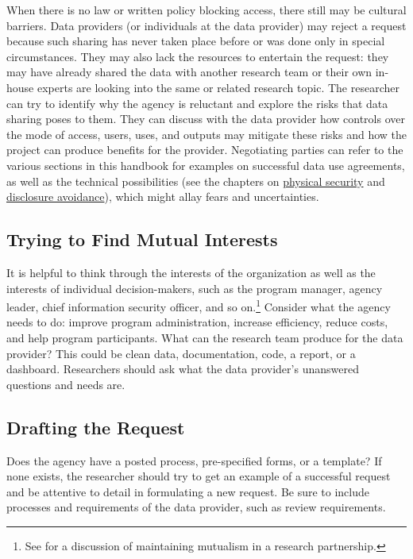 \documentclass[
]{book}
\begin{document}
When there is no law or written policy blocking access, there still may be cultural barriers. Data providers (or individuals at the data provider) may reject a request because such sharing has never taken place before or was done only in special circumstances. They may also lack the resources to entertain the request: they may have already shared the data with another research team or their own in-house experts are looking into the same or related research topic. The researcher can try to identify why the agency is reluctant and explore the risks that data sharing poses to them. They can discuss with the data provider how controls over the mode of access, users, uses, and outputs may mitigate these risks and how the project can produce benefits for the provider. Negotiating parties can refer to the various sections in this handbook for examples on successful data use agreements, as well as the technical possibilities (see the chapters on \protect\hyperlink{security}{physical security} and \protect\hyperlink{discavoid}{disclosure avoidance}), which might allay fears and uncertainties.

\hypertarget{trying-to-find-mutual-interests}{%
\subsection{Trying to Find Mutual Interests}\label{trying-to-find-mutual-interests}}

It is helpful to think through the interests of the organization as well as the interests of individual decision-makers, such as the program manager, agency leader, chief information security officer, and so on.\footnote{See \citet{coburn2013} for a discussion of maintaining mutualism in a research partnership.} Consider what the agency needs to do: improve program administration, increase efficiency, reduce costs, and help program participants. What can the research team produce for the data provider? This could be clean data, documentation, code, a report, or a dashboard. Researchers should ask what the data provider's unanswered questions and needs are.

\hypertarget{drafting-the-request}{%
\subsection{Drafting the Request}\label{drafting-the-request}}

Does the agency have a posted process, pre-specified forms, or a template? If none exists, the researcher should try to get an example of a successful request and be attentive to detail in formulating a new request. Be sure to include processes and requirements of the data provider, such as review requirements.
\end{document}

